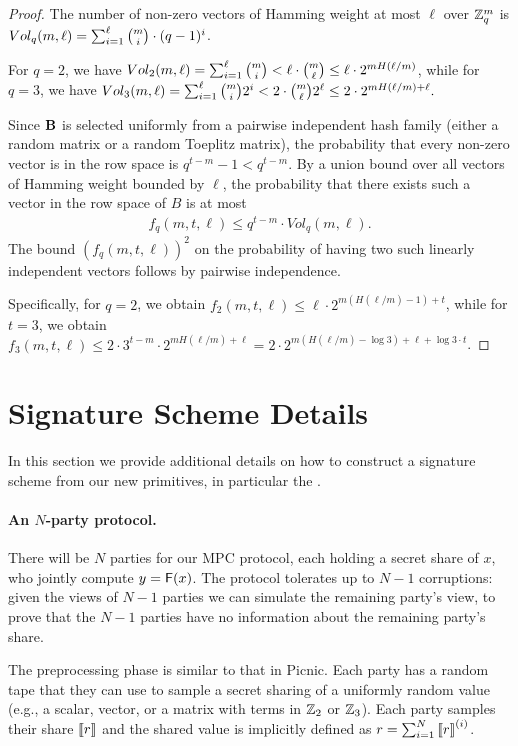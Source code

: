 \begin{proof}The number of non-zero vectors of Hamming weight at most $\ell$ over $\mathbb{Z}_q^m$ is
$Vol_q(m,\ell) = \sum_{i=1}^\ell \tbinom{m}{i} \cdot (q-1)^{i}$.

For $q = 2$, we have
$Vol_2(m,\ell) = \sum_{i=1}^\ell \tbinom{m}{i} <
\ell \cdot \tbinom{m}{\ell} \leq
\ell \cdot 2^{m H(\ell/m)}$, while for $q = 3$, we have
$Vol_3(m,\ell) = \sum_{i=1}^\ell \tbinom{m}{i} 2^i <
2 \cdot \tbinom{m}{\ell} 2^\ell \leq
2 \cdot 2^{m H(\ell/m) + \ell}.$

Since $\mat{B}$ is selected uniformly from a pairwise independent hash family (either a random matrix or a random Toeplitz matrix),
the probability that every non-zero vector is in the row space is $q^{t-m} - 1 < q^{t-m}$. By a union bound over all vectors of Hamming weight bounded by $\ell$, the probability that there exists such a vector in the row space of $B$ is at most
\begin{align*}
f_q(m,t,\ell) \leq q^{t-m} \cdot Vol_q(m,\ell).
\end{align*}
The bound $(f_q(m,t,\ell))^2$ on the probability of having two such linearly independent vectors follows by pairwise independence.

Specifically, for $q = 2$, we obtain
$f_2(m,t,\ell) \leq \ell \cdot 2^{m (H(\ell/m) - 1) + t}$,
while for $t = 3$, we obtain
$f_3(m,t,\ell) \leq 2 \cdot 3^{t-m} \cdot 2^{m H(\ell/m) + \ell} = 2 \cdot 2^{m (H(\ell/m) - \log 3) + \ell + \log 3 \cdot t}$.
\end{proof}


\section{Signature Scheme Details}
\label{appendix:picnic}
In this section we provide additional details on how to construct a signature scheme from our
new primitives, in particular the \ttOWF.


\paragraph{An $N$-party protocol.}
There will be $N$ parties for our MPC protocol, each holding a secret share of
$x$, who jointly compute $y = \mathsf{F}(x)$.  The protocol tolerates up to  $N-1$ 
corruptions: given the views of $N-1$ parties we can simulate the remaining
party's view, to prove that the $N-1$ parties have no information about the
remaining party's share. 

The preprocessing phase is similar to that in Picnic.  Each party has a random
tape that they can use to sample a secret sharing of a uniformly random value
(e.g.,  a scalar, vector, or a matrix with terms in $\mathbb{Z}_2$ or $\mathbb{Z}_3$).  Each
party samples their share $\left\llbracket r \right\rrbracket$ and the shared value is implicitly defined as
$r = \sum_{i=1}^N \left\llbracket r \right\rrbracket^{(i)}$.  

